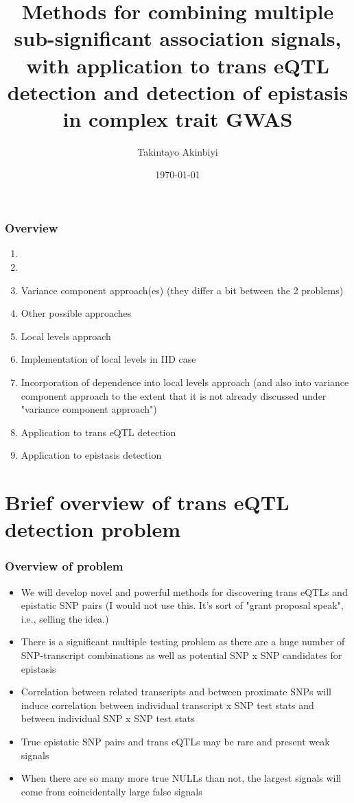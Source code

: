 \documentclass{beamer}
\title[local levels]{Methods for combining multiple sub-significant association signals, with application to trans eQTL detection and detection of epistasis in complex trait GWAS}
\author{Takintayo Akinbiyi}
\institute[U of C] 
{
University of Chicago \\ %
\medskip
\textit{akinbiyi2000@gmail.com} %
}
\date{\today} %
\begin{document}
\begin{frame}
\titlepage
 
\end{frame}

\begin{frame}
\frametitle{Overview} 
\tableofcontents 
\end{frame}

\begin{frame}
\begin{enumerate}
\item 
\item 
\item Variance component approach(es) (they differ a bit between the 2 problems)
\item Other possible approaches
\item Local levels approach
\item Implementation of local levels in IID case
\item Incorporation of dependence into local levels approach (and also into variance component approach to the extent that it is not already discussed under "variance component approach")
\item Application to trans eQTL detection
\item Application to epistasis detection
\end{enumerate}
\end{frame}

\section{Brief overview of trans eQTL detection problem}

\begin{frame}
\frametitle{Overview of problem}
\begin{itemize}
\item We will develop novel and powerful methods for discovering trans eQTLs and epistatic SNP pairs (I would not use this.  It's sort of "grant proposal speak", i.e., selling the idea.)
\item There is a significant multiple testing problem as there are a huge number of SNP-transcript combinations as well as potential SNP x SNP candidates for epistasis
\item Correlation between related transcripts and between proximate SNPs will induce correlation between individual transcript x SNP test stats and between individual SNP x SNP test stats
\item True epistatic SNP pairs and trans eQTLs may be rare and present weak signals
\item When there are so many more true NULLs than not, the largest signals will come from coincidentally large false signals
\end{itemize}
\end{frame}
\end{document}
